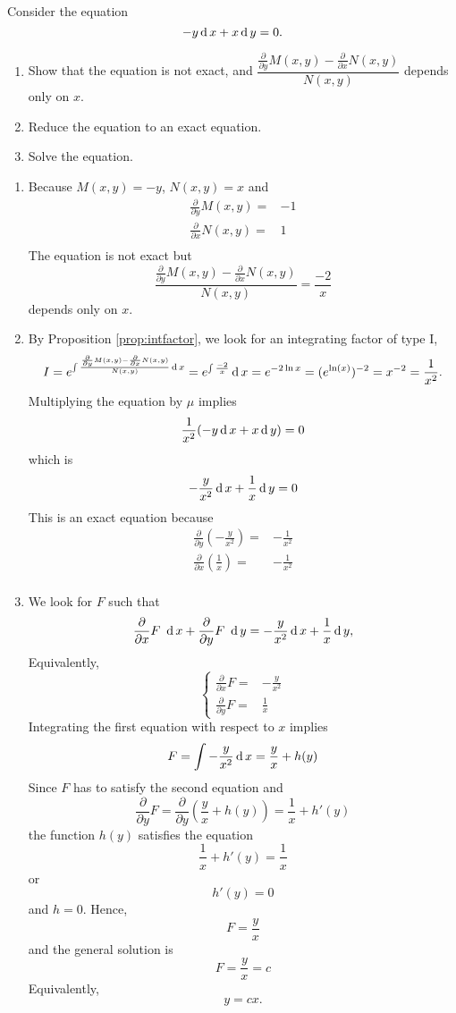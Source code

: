 \begin{exercise}
	Consider the equation
	\[ - y  \operatorname{d} x+ x \operatorname{d} y  =0. \]
	\begin{enumerate}
		\item  Show that the equation is not exact, and $\dfrac{\frac{\partial}{\partial y} M(x,y) - \frac{\partial}{\partial x} N(x,y)}{N(x,y)}$ depends only on $x$.
		\item Reduce the equation to an exact equation.
		\item Solve the equation.
	\end{enumerate}
\end{exercise}
\begin{exersol}
	\begin{enumerate}
		\item Because $M(x, y)=-y$, $N(x, y)=x$ and 
		\[
		\begin{split}
		\frac{\partial}{\partial y} M(x, y) =&-1 \\
		\frac{\partial}{\partial x} N(x, y) =&1 \\
		\end{split}
		\]
		The equation is not exact but
		\[ \frac{\frac{\partial}{\partial y} M(x,y) - \frac{\partial}{\partial x} N(x,y)}{N(x,y)}=  \frac{-2}{x}\] 
		depends only on $x$.
		\item By Proposition \ref{prop:intfactor}, 
			we look for an integrating factor of type I,
		\[  I= e^{\int \frac{\frac{\partial}{\partial y} M(x,y) - \frac{\partial}{\partial x} N(x,y)}{N(x,y)}\operatorname{d} x} = e^{\int  \frac{-2}{x}} \operatorname{d} x=e^{-2\ln x}=(e^{\ln(x)})^{-2}=x^{-2}=\frac{1}{x^2}. \]
		Multiplying the equation by $\mu$ implies
		\[ \frac{1}{x^2} (- y  \operatorname{d} x+x \operatorname{d} y ) = 0  \]
		which is 
		\[ - \frac{y}{x^2}  \operatorname{d} x+\frac{1}{x} \operatorname{d} y  = 0  \]
		This is an exact equation because
		\[
		\begin{split}
		\frac{\partial}{\partial y} ( - \frac{y}{x^2} ) =&-\frac{1}{x^2} \\
		\frac{\partial}{\partial x} (\frac{1}{x})=&-\frac{1}{x^2} \\
		\end{split}
		\]
		\item We look for $F$ such that 
		\[\frac{\partial}{\partial x} F  ~\operatorname{d} x+\frac{\partial}{\partial y} F ~\operatorname{d} y=  - \frac{y}{x^2}  \operatorname{d} x+\frac{1}{x} \operatorname{d} y, \]
		Equivalently, 
		\[
		\begin{cases}
		\frac{\partial}{\partial x} F  =& -\frac{y}{x^2}\\
		\frac{\partial}{\partial y} F  =& \frac{1}{x}
		\end{cases}
		\]
		Integrating the first equation with respect to $x$ implies
		\[  
		F = \int  -\frac{y}{x^2} \operatorname{d} x  =\frac{y}{x} + h(y)
		\]
		Since $F$ has to satisfy the second equation and 
		\[
		\frac{\partial}{\partial y} F = \frac{\partial}{\partial y} (\frac{y}{x} + h(y)) = \frac{1}{x} + h'(y)
		\]
		the function $h(y)$ satisfies the equation
		\[  \frac{1}{x} + h'(y) =\frac{1}{x} \]
		or 
		\[ h'(y) =0 \]
		and $h=0$. Hence, 
		\[
		F=  \frac{y}{x}
		\]
		and the general solution is 
		\[
		F=  \frac{y}{x}=c
		\]
		Equivalently,
		\[
		y   = cx.
		\]
	\end{enumerate}
\end{exersol}

